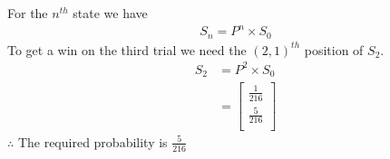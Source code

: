 \documentclass[journal,12pt,twocolumn]{IEEEtran}
\begin{document}
For the $n^{th}$ state we have
\begin{align}
    S_n = P^n\times S_0
\end{align}
To get a win on the third trial we need the $(2,1)^{th}$ position of $S_2$.
\begin{align}
    S_2 &= P^2\times S_0 \nonumber\\
    &= \left[
\begin{array}{c}
\frac{1}{216} \\[2pt]
\frac{5}{216} \\
\end{array}
\right]
\end{align}
$\therefore$ The required probability is $\frac{5}{216}$
\end{document}
